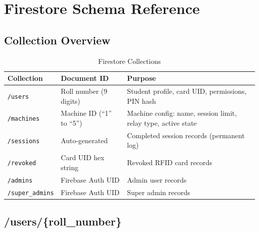\chapter{Firestore Schema Reference}
\label{app:firestore_schema}

\section{Collection Overview}

\begin{table}[H]
\centering
\caption{Firestore Collections}
\begin{tabular}{L{3.5cm}L{3.5cm}L{8cm}}
\toprule
\textbf{Collection} & \textbf{Document ID} & \textbf{Purpose} \\
\midrule
\texttt{/users} & Roll number (9 digits) & Student profile, card UID, permissions, PIN hash \\
\texttt{/machines} & Machine ID (``1'' to ``5'') & Machine config: name, session limit, relay type, active state \\
\texttt{/sessions} & Auto-generated & Completed session records (permanent log) \\
\texttt{/revoked} & Card UID hex string & Revoked RFID card records \\
\texttt{/admins} & Firebase Auth UID & Admin user records \\
\texttt{/super\_admins} & Firebase Auth UID & Super admin records \\
\bottomrule
\end{tabular}
\end{table}

\section{/users/\{roll\_number\}}

